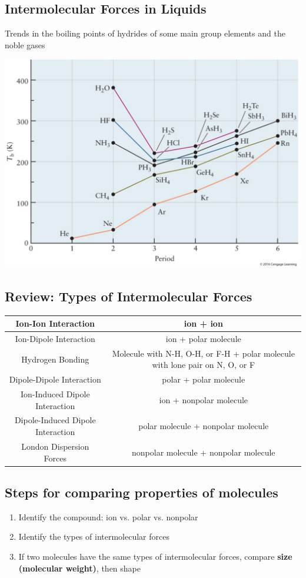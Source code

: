 \documentclass[10pt]{article}
\begin{document}
\subsection*{Intermolecular Forces in Liquids}
Trends in the boiling points of hydrides of some main group elements and the noble gases
\begin{center}
    \includegraphics*[scale=0.5]{W3_2}
\end{center}

\subsection*{Review: Types of Intermolecular Forces}
\begin{tabular}{|c|c|}
    \hline
    Ion-Ion Interaction & ion + ion \\
    \hline
    Ion-Dipole Interaction & ion + polar molecule \\
    \hline
    Hydrogen Bonding & Molecule with N-H, O-H, or F-H + polar molecule with lone pair on N, O, or F \\
    \hline
    Dipole-Dipole Interaction & polar + polar molecule \\
    \hline
    Ion-Induced Dipole Interaction & ion + nonpolar molecule \\
    \hline
    Dipole-Induced Dipole Interaction & polar molecule + nonpolar molecule \\
    \hline
    London Dispersion Forces & nonpolar molecule + nonpolar molecule\\
    \hline
\end{tabular}

\subsection*{Steps for comparing properties of molecules}
\begin{enumerate}
    \item Identify the compound: ion vs. polar vs. nonpolar
    \item Identify the types of intermolecular forces
    \item If two molecules have the same types of intermolecular forces, compare \textbf{size (molecular weight)}, then shape
\end{enumerate}
\end{document}

